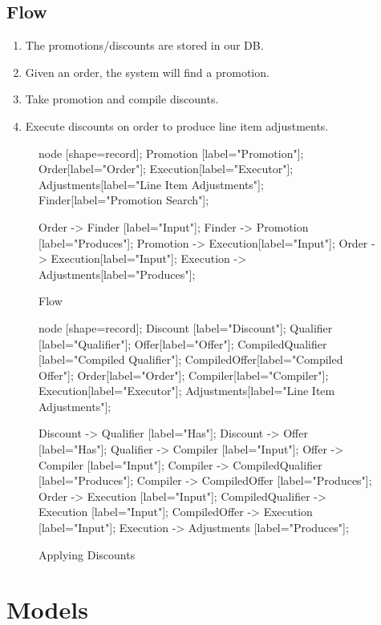 \documentclass[11pt]{article}
\begin{document}
\subsection{Flow}

\begin{enumerate}

    \item The promotions/discounts are stored in our DB. 
    \item Given an order, the system will find a promotion.
    \item Take promotion and compile discounts.
    \item Execute discounts on order to produce line item adjustments.
\end{enumerate}

\begin{figure}
\caption{Flow}
 {
    node [shape=record];
    Promotion [label="Promotion"];
    Order[label="Order"];
    Execution[label="Executor"];
    Adjustments[label="Line Item Adjustments"];
    Finder[label="Promotion Search"];

    Order -> Finder [label="Input"];
    Finder -> Promotion [label="Produces"];
    Promotion -> Execution[label="Input"];
    Order -> Execution[label="Input"];
    Execution -> Adjustments[label="Produces"];
}
\end{figure}

\begin{figure}
\caption{Applying Discounts}
 {
    node [shape=record];
    Discount [label="Discount"];
    Qualifier [label="Qualifier"];
    Offer[label="Offer"];
    CompiledQualifier [label="Compiled Qualifier"];
    CompiledOffer[label="Compiled Offer"];
    Order[label="Order"];
    Compiler[label="Compiler"];
    Execution[label="Executor"];
    Adjustments[label="Line Item Adjustments"];

    Discount -> Qualifier [label="Has"];
    Discount -> Offer [label="Has"];
    Qualifier -> Compiler [label="Input"];
    Offer -> Compiler [label="Input"];
    Compiler -> CompiledQualifier [label="Produces"];
    Compiler -> CompiledOffer [label="Produces"];
    Order -> Execution [label="Input"];
    CompiledQualifier -> Execution [label="Input"];
    CompiledOffer -> Execution [label="Input"];
    Execution -> Adjustments [label="Produces"];
}
\end{figure}
\newpage

\section{Models}
\end{document}
